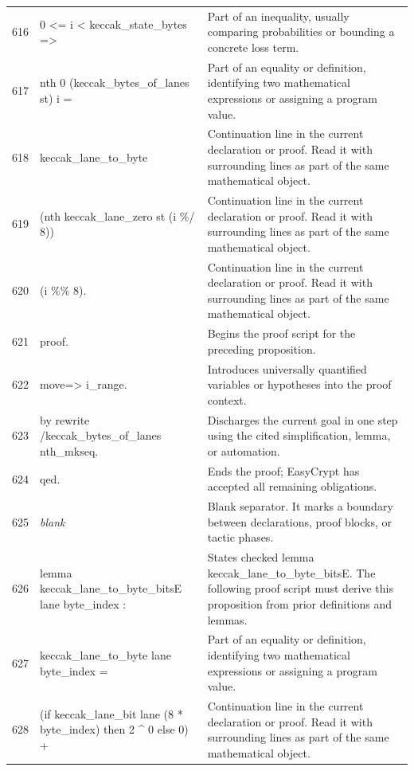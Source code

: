 \documentclass[10pt]{article}
\begin{document}
\begin{longtable}{r L{0.53\textwidth} L{0.37\textwidth}}
616 & {\ttfamily\scriptsize   0 <= i < keccak\_state\_bytes =>} & Part of an inequality, usually comparing probabilities or bounding a concrete loss term. \\
617 & {\ttfamily\scriptsize   nth 0 (keccak\_bytes\_of\_lanes st) i =} & Part of an equality or definition, identifying two mathematical expressions or assigning a program value. \\
618 & {\ttfamily\scriptsize   keccak\_lane\_to\_byte} & Continuation line in the current declaration or proof.  Read it with surrounding lines as part of the same mathematical object. \\
619 & {\ttfamily\scriptsize     (nth keccak\_lane\_zero st (i \%/ 8))} & Continuation line in the current declaration or proof.  Read it with surrounding lines as part of the same mathematical object. \\
620 & {\ttfamily\scriptsize     (i \%\% 8).} & Continuation line in the current declaration or proof.  Read it with surrounding lines as part of the same mathematical object. \\
621 & {\ttfamily\scriptsize proof.} & Begins the proof script for the preceding proposition. \\
622 & {\ttfamily\scriptsize move=> i\_range.} & Introduces universally quantified variables or hypotheses into the proof context. \\
623 & {\ttfamily\scriptsize by rewrite /keccak\_bytes\_of\_lanes nth\_mkseq.} & Discharges the current goal in one step using the cited simplification, lemma, or automation. \\
624 & {\ttfamily\scriptsize qed.} & Ends the proof; EasyCrypt has accepted all remaining obligations. \\
625 & {\ttfamily\scriptsize \emph{blank}} & Blank separator.  It marks a boundary between declarations, proof blocks, or tactic phases. \\
626 & {\ttfamily\scriptsize lemma keccak\_lane\_to\_byte\_bitsE lane byte\_index :} & States checked lemma keccak\_lane\_to\_byte\_bitsE.  The following proof script must derive this proposition from prior definitions and lemmas. \\
627 & {\ttfamily\scriptsize   keccak\_lane\_to\_byte lane byte\_index =} & Part of an equality or definition, identifying two mathematical expressions or assigning a program value. \\
628 & {\ttfamily\scriptsize   (if keccak\_lane\_bit lane (8 * byte\_index) then 2 \textasciicircum{} 0 else 0) +} & Continuation line in the current declaration or proof.  Read it with surrounding lines as part of the same mathematical object. \\

\end{longtable}
\end{document}
